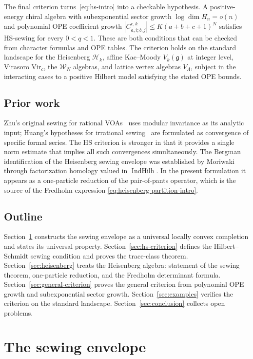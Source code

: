 \documentclass[11pt,reqno]{amsart}
\theoremstyle{definition}
\theoremstyle{remark}
\newcommand{\cH}{\mathcal{H}}
\newcommand{\cW}{\mathcal{W}}
\newcommand{\Vir}{\mathrm{Vir}}
\newcommand{\fg}{\mathfrak{g}}
\numberwithin{equation}{section}
\begin{document}
The final criterion turns~\eqref{eq:hs-intro} into a checkable
hypothesis. A positive-energy chiral algebra with subexponential
sector growth $\log\dim H_n = o(n)$ and polynomial OPE coefficient
growth $|C^{c,k}_{a,i;b,j}| \leq K(a+b+c+1)^N$ satisfies HS-sewing
for every $0 < q < 1$. These are both conditions that can be
checked from character formulas and OPE tables. The criterion holds
on the standard landscape for the Heisenberg $\cH_k$,
affine Kac--Moody $V_k(\fg)$ at integer level, Virasoro
$\Vir_c$, the $\cW_N$ algebras, and lattice vertex algebras
$V_\Lambda$, subject in the interacting cases to a positive Hilbert
model satisfying the stated OPE bounds.

\subsection{Prior work}

Zhu's original sewing for rational VOAs~\cite{Zhu96} uses modular
invariance as its analytic input; Huang's hypotheses for
irrational sewing~\cite{Huang05} are formulated as convergence
of specific formal series. The HS criterion is stronger in that
it provides a single norm estimate that implies all such
convergences simultaneously. The Bergman identification of the
Heisenberg sewing envelope was established by
Moriwaki~\cite{Moriwaki26b} through factorization homology valued
in $\operatorname{IndHilb}$. In the present formulation it appears
as a one-particle reduction of the pair-of-pants operator, which is
the source of the Fredholm expression
\eqref{eq:heisenberg-partition-intro}.

\subsection{Outline}

Section~\ref{sec:sewing-envelope} constructs the sewing envelope
as a universal locally convex completion and states its
universal property. Section~\ref{sec:hs-criterion} defines the
Hilbert--Schmidt sewing condition and proves the trace-class
theorem. Section~\ref{sec:heisenberg} treats the Heisenberg
algebra: statement of the sewing theorem, one-particle reduction,
and the Fredholm determinant formula.
Section~\ref{sec:general-criterion} proves the general criterion
from polynomial OPE growth and subexponential sector growth.
Section~\ref{sec:examples} verifies the criterion on the standard
landscape. Section~\ref{sec:conclusion} collects open problems.

\section{The sewing envelope}\label{sec:sewing-envelope}
\end{document}

